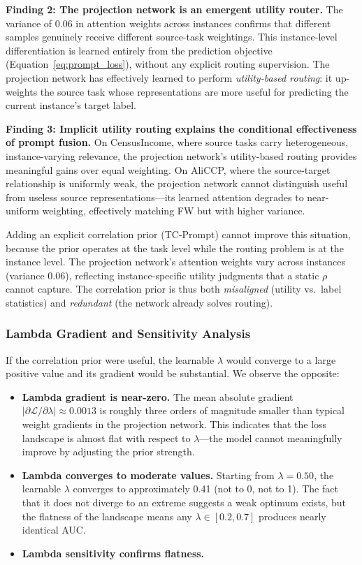 \documentclass[review,anonymous]{acmart}
\begin{document}
\textbf{Finding 2: The projection network is an emergent utility router.} The variance of
0.06 in attention weights across instances confirms that different samples
genuinely receive different source-task weightings. This instance-level
differentiation is learned entirely from the prediction objective
(Equation~\ref{eq:prompt_loss}), without any explicit routing supervision. The
projection network has effectively learned to perform \emph{utility-based routing}:
it up-weights the source task whose representations are more useful for predicting
the current instance's target label.

\textbf{Finding 3: Implicit utility routing explains the conditional effectiveness of prompt
fusion.} On CensusIncome, where source tasks carry heterogeneous, instance-varying
relevance, the projection network's utility-based routing provides meaningful
gains over equal weighting. On AliCCP, where the source-target relationship is
uniformly weak, the projection network cannot distinguish useful from useless
source representations---its learned attention degrades to near-uniform weighting,
effectively matching FW but with higher variance.

Adding an explicit correlation prior (TC-Prompt) cannot improve this situation,
because the prior operates at the task level while the routing problem is at the
instance level. The projection network's attention weights vary across instances
(variance 0.06), reflecting instance-specific utility judgments that a static
$\rho$ cannot capture. The correlation prior is thus both \emph{misaligned}
(utility vs.\ label statistics) and \emph{redundant} (the network already solves
routing).

\subsubsection{Lambda Gradient and Sensitivity Analysis}

If the correlation prior were useful, the learnable $\lambda$ would converge to a
large positive value and its gradient would be substantial. We observe the opposite:

\begin{itemize}
  \item \textbf{Lambda gradient is near-zero.} The mean absolute gradient
    $|\partial\mathcal{L}/\partial\lambda| \approx 0.0013$ is roughly three
    orders of magnitude smaller than typical weight gradients in the projection
    network. This indicates that the loss landscape is almost flat with respect
    to $\lambda$---the model cannot meaningfully improve by adjusting the prior
    strength.

  \item \textbf{Lambda converges to moderate values.} Starting from $\lambda=0.50$,
    the learnable $\lambda$ converges to approximately 0.41 (not to 0, not to 1).
    The fact that it does not diverge to an extreme suggests a weak optimum exists,
    but the flatness of the landscape means any $\lambda \in [0.2, 0.7]$ produces
    nearly identical AUC.

  \item \textbf{Lambda sensitivity confirms flatness.}
\end{itemize}
\end{document}
